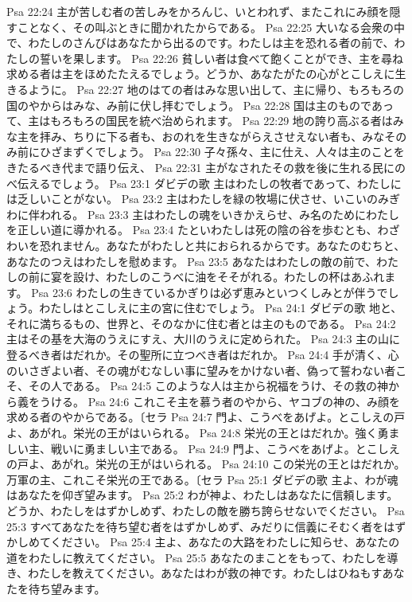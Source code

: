 Psa 22:24  主が苦しむ者の苦しみをかろんじ、いとわれず、またこれにみ顔を隠すことなく、その叫ぶときに聞かれたからである。
Psa 22:25  大いなる会衆の中で、わたしのさんびはあなたから出るのです。わたしは主を恐れる者の前で、わたしの誓いを果します。
Psa 22:26  貧しい者は食べて飽くことができ、主を尋ね求める者は主をほめたたえるでしょう。どうか、あなたがたの心がとこしえに生きるように。
Psa 22:27  地のはての者はみな思い出して、主に帰り、もろもろの国のやからはみな、み前に伏し拝むでしょう。
Psa 22:28  国は主のものであって、主はもろもろの国民を統べ治められます。
Psa 22:29  地の誇り高ぶる者はみな主を拝み、ちりに下る者も、おのれを生きながらえさせえない者も、みなそのみ前にひざまずくでしょう。
Psa 22:30  子々孫々、主に仕え、人々は主のことをきたるべき代まで語り伝え、
Psa 22:31  主がなされたその救を後に生れる民にのべ伝えるでしょう。
Psa 23:1  ダビデの歌 主はわたしの牧者であって、わたしには乏しいことがない。
Psa 23:2  主はわたしを緑の牧場に伏させ、いこいのみぎわに伴われる。
Psa 23:3  主はわたしの魂をいきかえらせ、み名のためにわたしを正しい道に導かれる。
Psa 23:4  たといわたしは死の陰の谷を歩むとも、わざわいを恐れません。あなたがわたしと共におられるからです。あなたのむちと、あなたのつえはわたしを慰めます。
Psa 23:5  あなたはわたしの敵の前で、わたしの前に宴を設け、わたしのこうべに油をそそがれる。わたしの杯はあふれます。
Psa 23:6  わたしの生きているかぎりは必ず恵みといつくしみとが伴うでしょう。わたしはとこしえに主の宮に住むでしょう。
Psa 24:1  ダビデの歌 地と、それに満ちるもの、世界と、そのなかに住む者とは主のものである。
Psa 24:2  主はその基を大海のうえにすえ、大川のうえに定められた。
Psa 24:3  主の山に登るべき者はだれか。その聖所に立つべき者はだれか。
Psa 24:4  手が清く、心のいさぎよい者、その魂がむなしい事に望みをかけない者、偽って誓わない者こそ、その人である。
Psa 24:5  このような人は主から祝福をうけ、その救の神から義をうける。
Psa 24:6  これこそ主を慕う者のやから、ヤコブの神の、み顔を求める者のやからである。〔セラ
Psa 24:7  門よ、こうべをあげよ。とこしえの戸よ、あがれ。栄光の王がはいられる。
Psa 24:8  栄光の王とはだれか。強く勇ましい主、戦いに勇ましい主である。
Psa 24:9  門よ、こうべをあげよ。とこしえの戸よ、あがれ。栄光の王がはいられる。
Psa 24:10  この栄光の王とはだれか。万軍の主、これこそ栄光の王である。〔セラ
Psa 25:1  ダビデの歌 主よ、わが魂はあなたを仰ぎ望みます。
Psa 25:2  わが神よ、わたしはあなたに信頼します。どうか、わたしをはずかしめず、わたしの敵を勝ち誇らせないでください。
Psa 25:3  すべてあなたを待ち望む者をはずかしめず、みだりに信義にそむく者をはずかしめてください。
Psa 25:4  主よ、あなたの大路をわたしに知らせ、あなたの道をわたしに教えてください。
Psa 25:5  あなたのまことをもって、わたしを導き、わたしを教えてください。あなたはわが救の神です。わたしはひねもすあなたを待ち望みます。
